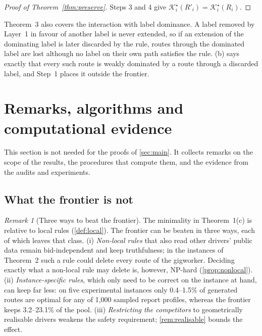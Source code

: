 \documentclass[11pt]{article}
\theoremstyle{definition}
\theoremstyle{remark}
\newtheorem{remark}{Remark}
\newcommand{\Ks}{\mathcal{K}^{\star}}
\begin{document}
\begin{proof}[Proof of Theorem~\ref{thm:preserve}]
Steps 3 and 4 give $\Ks_i(R'_i)=\Ks_i(R_i)$.
\end{proof}

Theorem~3 also covers the interaction with label dominance. A label removed by
Layer~1 in favour of another label is never extended, so if an extension of the
dominating label is later discarded by the rule, routes through the dominated
label are lost although no label on their own path satisfies the rule.
(b) says exactly that every such route is weakly dominated
by a route through a discarded label, and Step~1 places it outside the frontier.

\FloatBarrier
\section{Remarks, algorithms and computational evidence}
\label{sec:remarks}

This section is not needed for the proofs of \cref{sec:main}. It collects
remarks on the scope of the results, the procedures that compute them, and the
evidence from the audits and experiments.

\subsection{What the frontier is not}

\begin{remark}[Three ways to beat the frontier]\label{rem:scope}
The minimality in Theorem~1(c) is relative to local rules
(\cref{def:local}). The frontier can be beaten in three ways, each of which
leaves that class.
(i) \emph{Non-local rules} that also read other drivers' public data remain
bid-independent and keep truthfulness; in the instances of Theorem~2 such a rule
could delete every route of the gigworker. Deciding exactly what a non-local
rule may delete is, however, NP-hard (\cref{prop:nonlocal}).
(ii) \emph{Instance-specific rules}, which only need to be correct on the
instance at hand, can keep far less: on five experimental instances only
0.4--1.5\% of generated routes are optimal for any of 1,000 sampled report
profiles, whereas the frontier keeps 3.2--23.1\% of the pool.
(iii) \emph{Restricting the competitors} to geometrically realisable drivers
weakens the safety requirement; \cref{rem:realisable} bounds the effect.
\end{remark}
\end{document}
